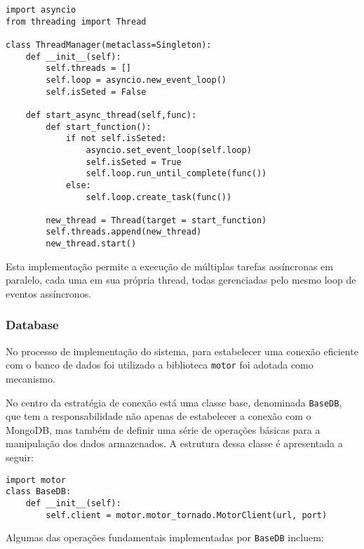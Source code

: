 \begin{verbatim}
import asyncio
from threading import Thread

class ThreadManager(metaclass=Singleton):
    def __init__(self):
        self.threads = []
        self.loop = asyncio.new_event_loop()
        self.isSeted = False

    def start_async_thread(self,func):
        def start_function():
            if not self.isSeted:
                asyncio.set_event_loop(self.loop)
                self.isSeted = True
                self.loop.run_until_complete(func())
            else:
                self.loop.create_task(func())

        new_thread = Thread(target = start_function)
        self.threads.append(new_thread)
        new_thread.start()
\end{verbatim}

Esta implementação permite a execução de múltiplas tarefas assíncronas em paralelo, cada uma em sua própria thread, todas gerenciadas pelo mesmo loop de eventos assíncronos.

\subsubsection{Database}\label{subsubsec:DatabaseImpl}
No processo de implementação do sistema, para estabelecer uma conexão eficiente com o banco de dados foi utilizado a biblioteca \texttt{motor} foi adotada como mecanismo.

No centro da estratégia de conexão está uma classe base, denominada \texttt{BaseDB}, que tem a responsabilidade não apenas de estabelecer a conexão com o MongoDB, mas também de definir uma série de operações básicas para a manipulação dos dados armazenados. A estrutura dessa classe é apresentada a seguir:

\begin{verbatim}
import motor
class BaseDB:
    def __init__(self):
        self.client = motor.motor_tornado.MotorClient(url, port)
\end{verbatim}

Algumas das operações fundamentais implementadas por \texttt{BaseDB} incluem:

